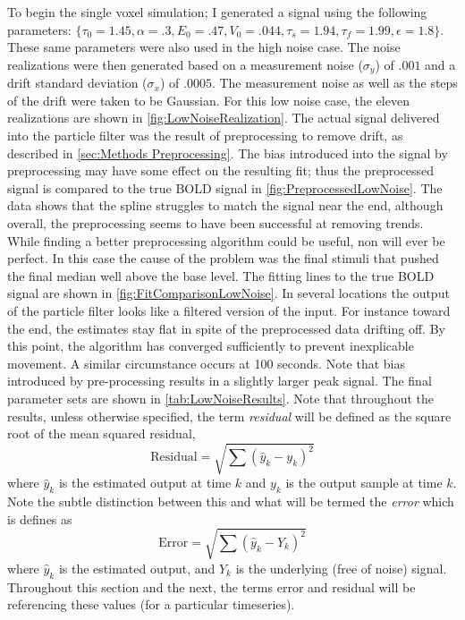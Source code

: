 To begin the single voxel simulation; I generated a signal using the following parameters:
$\{\tau_0 = 1.45, \alpha = .3, E_0 = .47, V_0 = .044, \tau_s = 1.94, \tau_f = 1.99, \epsilon = 1.8\}$.
These same parameters were also used in the high noise case. The noise realizations were
then generated based on a measurement noise ($\sigma_y$) of $.001$ and a drift standard deviation
($\sigma_x$) of $.0005$. The measurement noise as well as the steps of the drift
were taken to be Gaussian.
For this low noise case, the eleven realizations are shown in \autoref{fig:LowNoiseRealization}.
The actual signal delivered into the particle filter
was the result of preprocessing to remove drift, as described in 
\autoref{sec:Methods Preprocessing}. The bias introduced into the signal by preprocessing 
may have some effect on the resulting fit; thus the preprocessed signal is compared
to the true BOLD signal in \autoref{fig:PreprocessedLowNoise}.
The data shows that the spline struggles to match the signal near the end, although 
overall, the preprocessing seems to have been successful at removing trends. While finding
a better preprocessing algorithm could be useful, non will ever be perfect. In this case
the cause of the problem was the final stimuli that pushed the final median well above the base
level. The fitting lines to the true BOLD signal are shown in \autoref{fig:FitComparisonLowNoise}.
 In several locations the output
of the particle filter looks like a filtered version of the input. For instance toward the
end, the estimates stay flat in spite of the preprocessed data drifting off. By
this point, the algorithm has converged sufficiently to prevent inexplicable movement.
A similar circumstance occurs at 100 seconds. Note that bias introduced by pre-processing 
results in a slightly larger peak signal. The final parameter sets are shown in 
\autoref{tab:LowNoiseResults}. Note that throughout the results, unless otherwise specified,
the term \emph{residual} will be defined as the square root of the mean squared residual, 
\begin{equation}
\text{Residual} = \sqrt{\sum (\hat{y}_k - y_k)^2}
\end{equation}
where $\hat{y}_k$ is the estimated output at time $k$ and $y_k$ is the output
sample at time $k$. Note the subtle distinction between this and what will be 
termed the \emph{error} which is defines as 
\begin{equation}
\text{Error} = \sqrt{\sum (\hat{y}_k - Y_k)^2}
\end{equation}
where $\hat{y}_k$ is the estimated output, and $Y_k$ is the underlying (free of noise)
signal. Throughout this section and the next, the terms error and residual
will be referencing these values (for a particular timeseries).

